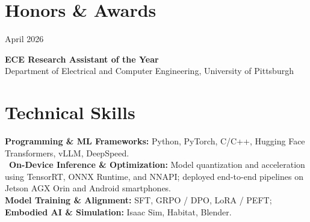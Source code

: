 \documentclass[11pt, letterpaper]{article}
\newenvironment{datedentry}[1]{%
  \par\noindent
  \begin{minipage}[t]{2.8cm}\raggedright\small #1\end{minipage}%
  \hspace{0.3cm}%
  \begin{minipage}[t]{\dimexpr\linewidth-3.1cm\relax}\raggedright
}{\end{minipage}\par\medskip}
\begin{document}
\section{Honors \& Awards}

\begin{datedentry}{April 2026}
\textbf{ECE Research Assistant of the Year}\\
Department of Electrical and Computer Engineering, University of Pittsburgh
\end{datedentry}

\section{Technical Skills}
\textbf{Programming \& ML Frameworks:} Python, PyTorch, C/C++, Hugging Face Transformers, vLLM, DeepSpeed.\\
\
\textbf{On-Device Inference \& Optimization:} Model quantization and acceleration using TensorRT, ONNX Runtime, and NNAPI; deployed end-to-end pipelines on Jetson AGX Orin and Android smartphones.\\
\textbf{Model Training \& Alignment:} SFT, GRPO / DPO, LoRA / PEFT;\\
\textbf{Embodied AI \& Simulation:} Isaac Sim, Habitat, Blender.
\end{document}
